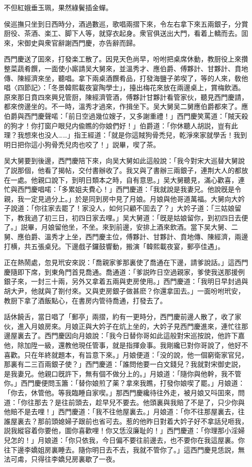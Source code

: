 不但紅娥垂玉珮，果然綠鬢插金蟬。

侯巡撫只坐到日西時分，酒過數巡，歌唱兩摺下來，令左右拿下來五兩銀子，分賞厨役、茶酒、楽工、脚下人等，就穿衣起身。衆官俱送出大門，看着上轎而去。囬來，宋御史與衆官辭謝西門慶，亦告辭而歸。

西門慶送了囬來，打發楽工散了。因見天色尚早，吩咐把桌席休動，教厨役上來攢整菜蔬肴饌，一面使小廝請吴大舅來，並溫秀才、應伯爵、傅夥計、甘夥計、賁地傳、陳經濟來坐，聽唱。拿下兩桌酒饌肴品，打發海鹽子弟喫了，等的人來，敎他唱〈四節記〉：「冬景韓熙載夜宴陶學士」，擡出梅花來放在兩邊桌上，賞梅飲酒。原來那日賁四來興兒管厨，陳經濟管酒，傅夥計甘夥計看管家伙，聽見西門慶請，都來傍邊坐的。不一時，溫秀才過來，作揖坐下。吴大舅吴二舅應伯爵都來了。應伯爵與西門慶聲喏：「前日空過幾位嫂子，又多謝重禮！」西門慶笑罵道：「賊天殺的狗才！你打窗户眼兒内偸瞧的你娘們好！」伯爵道：「你休聽人胡説，豈有此理？我想來也没人……」指王經道：「就是你這賊狗骨禿兒，乾淨來家就學舌！我到明日把你這小狗骨禿兒肉也咬了！」説畢，喫了茶。

吴大舅要到後邊，西門慶陪下來，向吴大舅如此這般說：「我今對宋大巡替大舅說了説那個，他看了揭帖，交付書辦收了。我又與了書辦三兩銀子，連荆大人的都放在一處。他親口說下，到明日類本之時，自有意思。」吴大舅聽見，滿心歡喜，連忙與西門慶唱喏：「多累姐夫費心！」西門慶道：「我就說是我妻兄。他說旣是令親，我一定見過分上。」於是同到房中見了月娘。月娘與他哥道萬福。大舅向大妗子說道：「你往家去罷了！家没人，如何只顧不囬去了？」大妗子道：「三姑娘留下，教我過了初三日，初四日家去哩。」吴大舅道：「旣是姑娘留你，到初四日去便了。」説畢，月娘留他坐，不坐。來到前邊，安排上酒來飲酒。當下吴大舅、二舅、應伯爵、溫秀才上坐，西門慶主位，傅夥計、甘夥計、賁地傳、陳經濟，兩邊打横，共五張桌兒。下邊戲子鑼鼓響動，搬演「韓熙載夜宴，郵亭佳遇」。

正在熱鬧處，忽見玳安來説：「喬親家爹那裏使了喬通在下邊，請爹說話。」這西門慶隨即下席，到東角門首見喬通。喬通道：「爹説昨日空過親家，爹使我送那援例銀子來，一封三十兩，另外又拿着五兩與吏房使用。」西門慶道：「我明日早封過與胡大尹，他就與了劄付來。又與吏房銀子做甚麽？你還拿囬去。」一面吩咐玳安，教厨下拿了酒飯點心，在書房内管待喬通，打發去了。

話休饒舌，當日唱了「郵亭」兩摺，約有一更時分，西門慶前邊人散了，收了家伙，進入月娘房來。月娘正與大妗子在炕上坐的，大妗子見西門慶進來，連忙往那邊屋裏去了。西門慶因向月娘說：「我今日替你哥如此這般對宋巡按說，他許下嘉他，除加陞一級，還教他現任管事，就是指揮僉事。我剛纔已對你哥說了，他好不喜歡。只在年終就題本，有旨意下來。」月娘便道：「没的說，他一個窮衛家官兒，那裏有二三百兩銀子使？」西門慶道：「誰問他要一白文錢兒？我就對宋御史説，是我妻兄。他親口旣許下，無有個不做分上的。」月娘道：「隨你與他幹，我不管你。」西門慶便問玉簫：「替你娘煎了薬？拿來我瞧，打發你娘喫了罷。」月娘道：「你去，休管他。等我臨睡自家喫。」那西門慶纔待往外走，被月娘又呌囬來，問道：「你往那去？是往前頭去，趁早兒不要去。他頭裏與我賠了不是了，只少你與他賠不是去哩！」西門慶道：「我不往他屋裏去。」月娘道：「你不往那屋裏去，往誰屋裏去？那前頭媳婦子跟前也省可去。惹的他昨日對着大妗子好不拿話兒咂我，説我縱容着你要他，圖你喜歡哩！你又恁沒廉耻的！」西門慶道：「你理那小淫婦兒怎的！」月娘道：「你只依我，今日偏不要往前邊去，也不要你在我這屋裏。你往下邊李嬌姐房裏睡去。隨你明日去不去，我就不管你了。」這西門慶見恁説，無法可䖏，只得往李嬌兒房裏歇了一夜。


